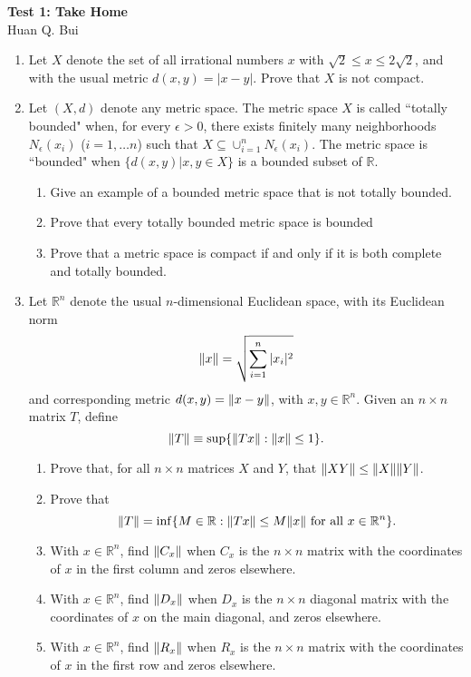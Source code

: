 \documentclass[11pt]{article}
\begin{document}
\begin{center}
{\Large\bf  Test 1:  Take Home}\\
$\,$\\
{\Large  Huan Q. Bui}
\end{center}


\noindent 
\begin{enumerate}
\item  Let $X$ denote the set of all irrational numbers $x$ with $ \sqrt{2} \leq x \leq 2 \sqrt{2}$,   and with the usual metric $d(x,y) = | x - y |$.  Prove that $X$ is not compact.

\item  Let $(X,d)$ denote any metric space.  The metric space $X$ is called ``totally bounded" when,  for every $\epsilon > 0$,   there exists finitely many neighborhoods $N_\epsilon ( x_i )$  ($i=1,\ldots n$)
such that $X \subseteq \cup_{i=1}^n N_\epsilon ( x_i ) $.  The metric space is ``bounded" when $\{{d(x,y) \vert x,y \in X }\}$ is a bounded subset of $\mathbb{R}$.
\begin{enumerate}
\item  Give an example of a bounded metric space that is not totally bounded.
\item  Prove that every totally bounded metric space is bounded
\item  Prove that a metric space is compact if and only if it is both complete and totally bounded.
\end{enumerate}
\item  Let $\mathbb{R}^n$ denote the usual $n$-dimensional Euclidean space,   with its Euclidean  norm
$$ \norm{x}  = \sqrt{ \sum_{i=1}^n |x_i|^2}$$ and corresponding metric $d(x,y) = \norm{x  - y} $,  with    $ x,y \in \mathbb{R}^n$.
Given an $n \times n$ matrix $T$,  define 
$$ \norm{T}  \equiv \sup  \{ \norm{T x } : \norm{ x } \leq 1\} .$$

\begin{enumerate}
\item  Prove that,   for all $n \times n$ matrices $X$ and $Y$,  that $ \norm{X Y}  \leq  \norm{X}\norm{Y} $.
\item  Prove that
$$  \norm{T}  =  \inf  \{ M \in \mathbb{R} : \norm{Tx} \leq M \norm{x}  \mbox{ for all } x \in \mathbb{R}^n \}. $$
\item  With $x \in \mathbb{R}^n$,   find $ \norm{C_x}  $ when $C_x$ is the $n \times n$ matrix with the coordinates of $x$ in the first column and zeros elsewhere.
\item   With $x \in \mathbb{R}^n$,   find $ \norm{D_x} $ when $D_x$ is the $n \times n$ diagonal matrix with the coordinates of  $x$  on the main diagonal,
and zeros elsewhere.
\item  With $x \in \mathbb{R}^n$,   find $ \norm{R_x} $ when $R_x$ is the $n \times n$ matrix with the coordinates of $x$ in the first row and zeros elsewhere.


\end{enumerate}
\end{enumerate}
\end{document}

